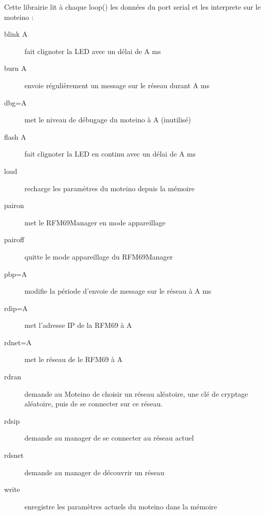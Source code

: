 \documentclass{report}
\begin{document}
Cette librairie lit à chaque loop() les données du port serial et les interprete sur le moteino :
\begin{description}
\item[blink A] fait clignoter la LED avec un délai de A ms
\item[burn A] envoie régulièrement un message sur le réseau durant A ms
\item[dbg=A] met le niveau de débugage du moteino à A (inutilisé)
\item[flash A] fait clignoter la LED en continu avec un délai de A ms
\item[load] recharge les paramètres du moteino depuis la mémoire
\item[pairon] met le RFM69Manager en mode appareillage
\item[pairoff] quitte le mode appareillage du RFM69Manager
\item[pbp=A] modifie la période d'envoie de message sur le réseau à A ms
\item[rdip=A] met l'adresse IP de la RFM69 à A
\item[rdnet=A] met le réseau de le RFM69 à A
\item[rdran] demande au Moteino de choisir un réseau aléatoire, une clé de cryptage aléatoire, puis de se connecter sur ce réseau.
\item[rdsip] demande au manager de se connecter au réseau actuel
\item[rdsnet] demande au manager de découvrir un réseau
\item[write] enregistre les paramètres actuels du moteino dans la mémoire
\end{description}
\end{document}
